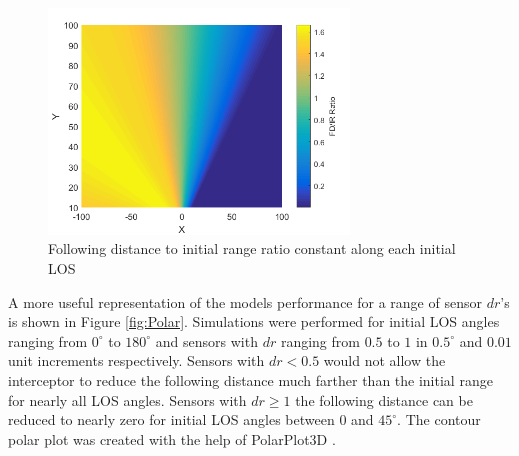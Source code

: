 \documentclass[conference]{IEEEtran}
\begin{document}




\begin{figure}[H]
	\centering
	\includegraphics[width=8cm]{FDIR_Rays.png}
	\caption{Following distance to initial range ratio constant along each initial LOS}
	\label{fig:Rays}
\end{figure}

A more useful representation of the models performance for a range of sensor $dr$'s is shown in Figure \ref{fig:Polar}. Simulations were performed for initial LOS angles ranging from $0^{\circ}$ to $180^{\circ}$ and sensors with $dr$ ranging from $0.5$ to $1$ in $0.5^{\circ}$ and $0.01$ unit increments respectively. Sensors with $dr < 0.5$ would not allow the interceptor to reduce the following distance much farther than the initial range for nearly all LOS angles. Sensors with $dr \geq 1$ the following distance can be reduced to nearly zero for initial LOS angles between $0$ and $45^{\circ}$. The contour polar plot was created with the help of PolarPlot3D \cite{Polar3d}.
\end{document}
